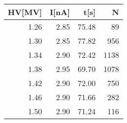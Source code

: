 \begin{tabular}{rrrr}
\toprule
 HV[MV] &  I[nA] &  t[s] &    N \\
\midrule
   1.26 &   2.85 & 75.48 &   89 \\
   1.30 &   2.85 & 77.82 &  956 \\
   1.34 &   2.90 & 72.42 & 1138 \\
   1.38 &   2.95 & 69.70 & 1078 \\
   1.42 &   2.90 & 72.00 &  750 \\
   1.46 &   2.90 & 71.66 &  282 \\
   1.50 &   2.90 & 71.24 &  116 \\
\bottomrule
\end{tabular}
